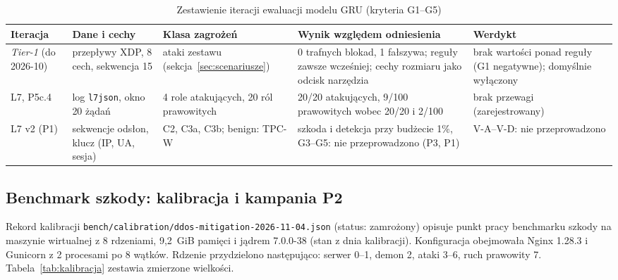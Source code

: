 \documentclass[a4paper,12pt]{article}
\begin{document}
\begin{table}[H]
\centering
\scriptsize
\caption{Zestawienie iteracji ewaluacji modelu GRU (kryteria G1--G5)}\label{tab:gru_iteracje}
\begin{tabularx}{\linewidth}{@{}L{1.9cm}L{2.3cm}L{2.4cm}YL{2.1cm}@{}}
\toprule
Iteracja & Dane i cechy & Klasa zagrożeń & Wynik względem odniesienia & Werdykt \\
\midrule
\textit{Tier-1} (do 2026-10) & przepływy XDP, 8 cech, sekwencja 15 & ataki zestawu (sekcja~\ref{sec:scenariusze}) & 0 trafnych blokad, 1 fałszywa; reguły zawsze wcześniej; cechy rozmiaru jako odcisk narzędzia & brak wartości ponad reguły (G1 negatywne); domyślnie wyłączony \\
L7, P5c.4 & log \texttt{l7json}, okno 20 żądań & 4 role atakujących, 20 ról prawowitych & 20/20 atakujących, 9/100 prawowitych wobec 20/20 i 2/100 & brak przewagi (zarejestrowany) \\
L7 v2 (P1) & sekwencje odsłon, klucz (IP, UA, sesja) & C2, C3a, C3b; benign: TPC-W & szkoda i detekcja przy budżecie 1\%, G3--G5: nie przeprowadzono (P3, P1) & V-A--V-D: nie przeprowadzono \\
\bottomrule
\end{tabularx}
\end{table}

\subsection{Benchmark szkody: kalibracja i kampania P2}\label{sec:wyniki_kalibracja}
Rekord kalibracji \texttt{bench/calibration/ddos-mitigation-2026-11-04.json} (status: zamrożony) opisuje punkt pracy benchmarku szkody na maszynie wirtualnej z 8 rdzeniami, 9,2~GiB pamięci i jądrem 7.0.0-38 (stan z dnia kalibracji). Konfiguracja obejmowała Nginx 1.28.3 i Gunicorn z 2 procesami po 8 wątków. Rdzenie przydzielono następująco: serwer 0--1, demon 2, ataki 3--6, ruch prawowity 7. Tabela~\ref{tab:kalibracja} zestawia zmierzone wielkości.
\end{document}
